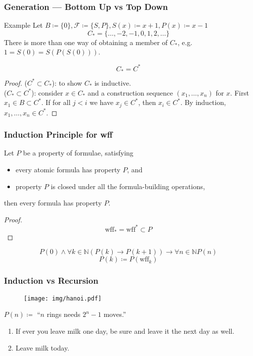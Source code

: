 \documentclass[UTF8,aspectratio=43,11pt,colorlinks,compress,openany]{beamer}%
\begin{document}
\begin{frame}\frametitle{Generation --- Bottom Up vs Top Down}
\setlength\abovedisplayskip{0pt}
\setlength\belowdisplayskip{0pt}
\begin{block}{Example}
		Let $B\coloneqq \{0\}, \mathcal{F}\coloneqq \{S,P\}, S(x)\coloneqq x+1, P(x)\coloneqq x-1$
		\[C_*=\{\dots,-2,-1,0,1,2,\dots\}\]
		There is more than one way of obtaining a member of $C_*$, e.g. $1=S(0)=S(P(S(0)))$.
\end{block}
\begin{theorem}
	\[C_*=C^*\]
\end{theorem}
\begin{proof}
	($C^*\subset C_*$): to show $C_*$ is inductive.\\
	($C_*\subset C^*$): consider $x\in C_*$ and a construction sequence $(x_1,\dots,x_n)$ for $x$. First $x_1\in B\subset C^*$. If for all $j<i$ we have $x_j\in C^*$, then $x_i\in C^*$. By induction, $x_1,\dots,x_n\in C^*$.
\end{proof}
\end{frame}

\begin{frame}\frametitle{Induction Principle for wff}
	\begin{theorem}
		Let $P$ be a property of formulae, satisfying
		\begin{itemize}
		\item every atomic formula has property $P$, and
		\item property $P$ is closed under all the formula-building operations,
		\end{itemize}
		then every formula has property $P$.
	\end{theorem}
	\begin{proof}
		\[\mathrm{wff}_*=\mathrm{wff}^*\subset P\]
	\end{proof}
	\[P(0)\wedge\forall k\in\mathbb{N}(P(k)\to P(k+1))\to\forall n\in\mathbb{N} P(n)\]
	\[P(k)\coloneqq P(\mathrm{wff}_k)\]
\end{frame}

\begin{frame}\frametitle{Induction vs Recursion}
\begin{figure}[H]
\texttt{[image: img/hanoi.pdf]}
\end{figure}
\begin{center}
$P(n)\coloneqq $ ``$n$ rings needs $2^n-1$ moves.''
\end{center}
\begin{block}{}
\begin{enumerate}
\item If ever you leave milk one day, be sure and leave it the next day as well.
\item Leave milk today.
\end{enumerate}
\end{block}
\centering
{}
\end{frame}
\end{document}
